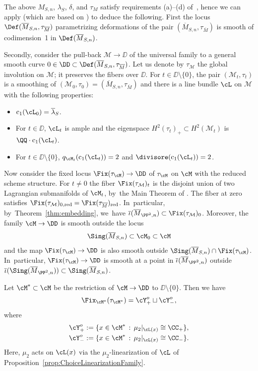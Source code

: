 The above $M_{S,n}$, $\lambda_S$, $\delta$, and $\tau_M$ satisfy requirements (a)--(d) of~\cite[\S 2]{involutions1}, hence we can apply \cite[Prop.\,2.1 \& Cor.\,2.2]{involutions1} (which are based on \cite{Namikawa:Def, markman:modular}) to deduce the following.
First the locus $\Def(\overline{M}_{S,n},\tau_{\overline{M}})$ parametrizing deformations of the pair $(\overline{M}_{S,n},\tau_{\overline{M}})$ is smooth of codimension~1 in $\Def(\overline{M}_{S,n})$.

Secondly, consider the pull-back $\mathcal{M}\to \DD$ of the universal family to a general smooth curve $0\in \DD\subset \Def(\overline{M}_{S,n},\tau_{\overline{M}})$.
Let us denote by $\tau_{\mathcal{M}}$ the global involution on $\mathcal{M}$; it preserves the fibers over $\DD$.
For $t\in \DD\setminus\{0\}$, the pair $(\mathcal{M}_t, \tau_t)$ is a smoothing of $(\mathcal{M}_0, \tau_0)=(\overline{M}_{S,n},\tau_{\overline{M}})$ and there is a line bundle $\cL$ on $\mathcal{M}$ with the following properties:
\begin{itemize}
\item $\mathrm{c}_1(\cL_0)=\overline{\lambda}{}_S$.
\item For $t\in \DD$, $\cL_t$ is ample and the eigenspace $H^2(\tau_t)_{+}\subset H^2(\mathcal{M}_t)$ is $\QQ\cdot \mathrm{c}_1(\cL_t)$.
\item For $t\in \DD\setminus\{0\}$, $q_{\cM_t}(\mathrm{c}_1(\cL_t))=2$ and $\divisore(\mathrm{c}_1(\cL_t))=2$.
\end{itemize}

Now consider the fixed locus $\Fix(\tau_{\cM})\to \DD$ of $\tau_{\cM}$ on $\cM$ with the reduced scheme structure.
For $t\ne0$ the fiber $\Fix(\tau_{\mathcal M})_t$ is the disjoint union of two Lagrangian submanifolds of $\cM_t$, by~the Main Theorem of \cite{involutions1}.
The fiber at zero satisfies $\Fix(\tau_{\mathcal M})_{0,\mathrm{red}}=\Fix(\tau_{\overline{M}})_{\mathrm{red}}$. In~particular, by~Theorem~\ref{thm:embedding}, we~have $\overline{\iota}(\overline{M}_{\PP^2,n})\subset \Fix(\tau_{\mathcal M})_0$.
Moreover, the family $\cM\to \DD$ is smooth outside the locus
\[
\Sing(\overline{M}_{S,n})\subset \cM_0 \subset \cM
\]
and the map $\Fix(\tau_{\cM})\to \DD$ is also smooth outside $\Sing(\overline{M}_{S,n})\cap \Fix(\tau_{\cM})$. In~particular, $\Fix(\tau_{\cM})\to \DD$ is smooth at a point in $\overline{\iota}(\overline{M}_{\PP^2,n})$ outside $\overline{\iota}(\Sing(\overline{M}_{\PP^2,n}))\subset \Sing(\overline{M}_{S,n})$.

Let $\cM^{*}\subset\cM$ be the restriction of $\cM\to\DD$ to $\DD\setminus\{0\}$.
Then we have
\[
\Fix_{\cM^{*}}(\tau_{\cM^{*}})= \cY^o_+ \sqcup \cY^o_-,
\]
where
\begin{equation*}
\begin{split}
\cY^o_+ &:=\{ x\in \cM^* \,:\, \mu_2|_{\cL(x)} \cong \CC_{+}\}, \\
\cY^o_- &:=\{ x\in \cM^* \,:\, \mu_2|_{\cL(x)} \cong \CC_{-}\}.
\end{split}
\end{equation*}
Here, $\mu_2$ acts on $\cL(x)$ via the $\mu_2$-linearization of $\cL$ of Proposition~\ref{prop:ChoiceLinearizationFamily}.


